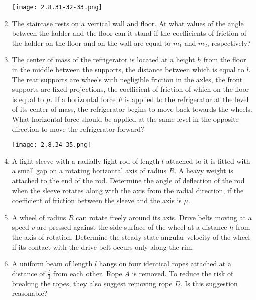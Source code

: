 \documentclass{article}
\begin{document}
\begin{enumerate}[label=2.8.\arabic*]
\begin{center}
    \texttt{[image: 2.8.31-32-33.png]}
\end{center}

\item The staircase rests on a vertical wall and floor. At what values of the angle between the ladder and the floor can it stand if the coefficients of friction of the ladder on the floor and on the wall are equal to $m_1$ and $m_2$, respectively?

\item The center of mass of the refrigerator is located at a height $h$ from the floor in the middle between the supports, the distance between which is equal to $l$. The rear supports are wheels with negligible friction in the axles, the front supports are fixed projections, the coefficient of friction of which on the floor is equal to $\mu$. If a horizontal force $F$ is applied to the refrigerator at the level of its center of mass, the refrigerator begins to move back towards the wheels. What horizontal force should be applied at the same level in the opposite direction to move the refrigerator forward?

\begin{center}
    \texttt{[image: 2.8.34-35.png]}
\end{center}

\item A light sleeve with a radially light rod of length $l$ attached to it is fitted with a small gap on a rotating horizontal axis of radius $R$. A heavy weight is attached to the end of the rod. Determine the angle of deflection of the rod when the sleeve rotates along with the axis from the radial direction, if the coefficient of friction between the sleeve and the axis is $\mu$.

\item A wheel of radius $R$ can rotate freely around its axis. Drive belts moving at a speed $v$ are pressed against the side surface of the wheel at a distance $h$ from the axis of rotation. Determine the steady-state angular velocity of the wheel if its contact with the drive belt occurs only along the rim.

\item A uniform beam of length $l$ hangs on four identical ropes attached at a distance of $\frac{l}{3}$ from each other. Rope $A$ is removed. To reduce the risk of breaking the ropes, they also suggest removing rope $D$. Is this suggestion reasonable?


\end{enumerate}
\end{document}
